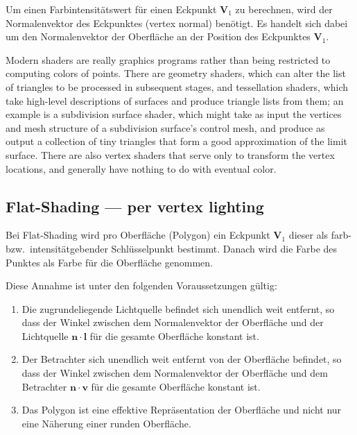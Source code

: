 Um einen Farbintensitätswert für einen Eckpunkt $\bm{V}_{1}$ zu berechnen, wird der
Normalenvektor des Eckpunktes (vertex normal) benötigt. Es handelt sich dabei
um den Normalenvektor der Oberfläche an der Position des Eckpunktes $\bm{V}_{1}$.

Modern shaders are really graphics programs rather than being restricted to
computing colors of points. There are geometry shaders, which can alter the
list of triangles to be processed in subsequent stages, and tessellation
shaders, which take high-level descriptions of surfaces and produce triangle
lists from them; an example is a subdivision surface shader, which might take
as input the vertices and mesh structure of a subdivision surface’s control
mesh, and produce as output a collection of tiny triangles that form a good
approximation of the limit surface. There are also vertex shaders that serve
only to transform the vertex locations, and generally have nothing to do with
eventual color.

\subsection{Flat-Shading --- per vertex lighting}
\label{subsec:flat_shading}


Bei Flat-Shading wird pro Oberfläche (Polygon) ein Eckpunkt $\bm{V}_{1}$ dieser als
farb- bzw.\ intensitätgebender Schlüsselpunkt bestimmt. Danach wird die Farbe
des Punktes als Farbe für die Oberfläche genommen.

Diese Annahme ist unter den folgenden Voraussetzungen gültig:
\begin{enumerate}
    \item{Die zugrundeliegende Lichtquelle befindet sich unendlich weit
            entfernt, so dass der Winkel zwischen dem
            Normalenvektor der Oberfläche und der Lichtquelle
            $\bm{n}\cdot{}\bm{l}$ für die gesamte Oberfläche konstant ist.}
    \item{Der Betrachter sich unendlich weit entfernt von der Oberfläche
            befindet, so dass der Winkel zwischen dem Normalenvektor der
            Oberfläche und dem Betrachter $\bm{n}\cdot{}\bm{v}$ für die
            gesamte Oberfläche konstant ist.}
    \item{Das Polygon ist eine effektive Repräsentation der Oberfläche
            und nicht nur eine Näherung einer runden Oberfläche.}
\end{enumerate}

